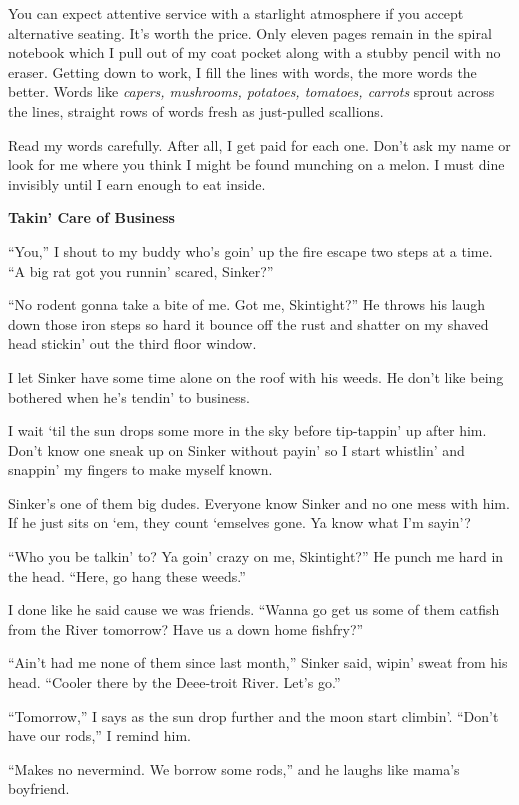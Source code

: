 \documentclass[
]{article}
\begin{document}
You can expect attentive service with a starlight atmosphere if you
accept alternative seating. It's worth the price. Only eleven pages
remain in the spiral notebook which I pull out of my coat pocket along
with a stubby pencil with no eraser. Getting down to work, I fill the
lines with words, the more words the better. Words like \emph{capers,
mushrooms, potatoes, tomatoes, carrots} sprout across the lines,
straight rows of words fresh as just-pulled scallions.

Read my words carefully. After all, I get paid for each one. Don't ask
my name or look for me where you think I might be found munching on a
melon. I must dine invisibly until I earn enough to eat inside.

\textbf{\hfill\break
}

\textbf{Takin' Care of Business}

``You,'' I shout to my buddy who's goin' up the fire escape two steps at
a time. ``A big rat got you runnin' scared, Sinker?''

``No rodent gonna take a bite of me. Got me, Skintight?'' He throws his
laugh down those iron steps so hard it bounce off the rust and shatter
on my shaved head stickin' out the third floor window.

I let Sinker have some time alone on the roof with his weeds. He don't
like being bothered when he's tendin' to business.

I wait `til the sun drops some more in the sky before tip-tappin' up
after him. Don't know one sneak up on Sinker without payin' so I start
whistlin' and snappin' my fingers to make myself known.

Sinker's one of them big dudes. Everyone know Sinker and no one mess
with him. If he just sits on `em, they count `emselves gone. Ya know
what I'm sayin'?

``Who you be talkin' to? Ya goin' crazy on me, Skintight?'' He punch me
hard in the head. ``Here, go hang these weeds.''

I done like he said cause we was friends. ``Wanna go get us some of them
catfish from the River tomorrow? Have us a down home fishfry?''

``Ain't had me none of them since last month,'' Sinker said, wipin'
sweat from his head. ``Cooler there by the Deee-troit River. Let's go.''

``Tomorrow,'' I says as the sun drop further and the moon start
climbin'. ``Don't have our rods,'' I remind him.

``Makes no nevermind. We borrow some rods,'' and he laughs like mama's
boyfriend.
\end{document}
